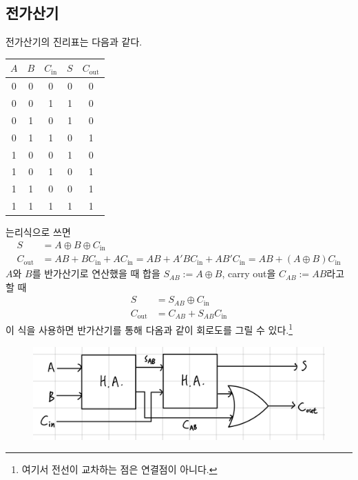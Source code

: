 \documentclass{scrartcl}
\begin{document}
\subsection{전가산기}
전가산기의 진리표는 다음과 같다.
\begin{table}[H]
  \centering
  \begin{tabular}{ccc|cc}
    \hline
    \(A\) & \(B\) & \(C_\text{in}\) & \(S\) & \(C_\text{out}\) \\
    \hline
    0 & 0 & 0 & 0 & 0 \\
    0 & 0 & 1 & 1 & 0 \\
    0 & 1 & 0 & 1 & 0 \\
    0 & 1 & 1 & 0 & 1 \\
    1 & 0 & 0 & 1 & 0 \\
    1 & 0 & 1 & 0 & 1 \\
    1 & 1 & 0 & 0 & 1 \\
    1 & 1 & 1 & 1 & 1 \\
    \hline
  \end{tabular}
\end{table}
는리식으로 쓰면
\begin{align*}
  S &= A \oplus B \oplus C_\text{in} \\
  C_\text{out} &= AB + BC_\text{in} + AC_\text{in} = AB + A' BC_\text{in} + AB' C_\text{in} = AB + (A \oplus B) C_\text{in}
\end{align*}
\(A\)와 \(B\)를 반가산기로 연산했을 때 합을 \(S_{AB} := A \oplus B\), carry out을 \(C_{AB} := AB\)라고 할 때
\begin{align*}
  S &= S_{AB} \oplus C_\text{in} \\
  C_\text{out} &= C_{AB} + S_{AB} C_\text{in}
\end{align*}
이 식을 사용하면 반가산기를 통해 다옴과 같이 회로도를 그릴 수 있다.\footnote{여기서 전선이 교차하는 점은 연결점이 아니다.}
\begin{figure}[H]
  \centering
  \includegraphics[width=0.75\linewidth]{full-adder.jpeg}
\end{figure}
\end{document}
